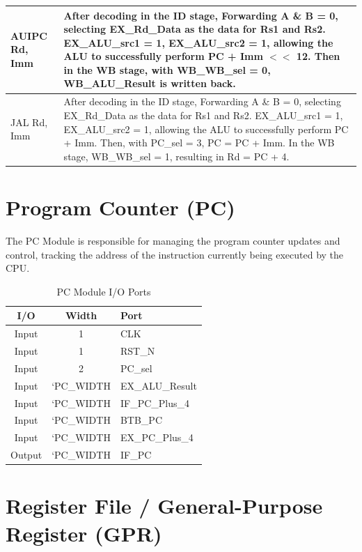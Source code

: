 \documentclass[12pt,a4paper]{report}
\begin{document}
\begin{longtable}{|l|p{12cm}|}
AUIPC Rd, Imm & After decoding in the ID stage, Forwarding A \& B = 0, selecting EX\_Rd\_Data as the data for Rs1 and Rs2. EX\_ALU\_src1 = 1, EX\_ALU\_src2 = 1, allowing the ALU to successfully perform PC + Imm $<<$ 12. Then in the WB stage, with WB\_WB\_sel = 0, WB\_ALU\_Result is written back. \\
\hline

JAL Rd, Imm & After decoding in the ID stage, Forwarding A \& B = 0, selecting EX\_Rd\_Data as the data for Rs1 and Rs2. EX\_ALU\_src1 = 1, EX\_ALU\_src2 = 1, allowing the ALU to successfully perform PC + Imm. Then, with PC\_sel = 3, PC = PC + Imm. In the WB stage, WB\_WB\_sel = 1, resulting in Rd = PC + 4. \\
\hline

\end{longtable}

\newpage

\section{Program Counter (PC)}

The PC Module is responsible for managing the program counter updates and control, tracking the address of the instruction currently being executed by the CPU.

\begin{table}[htbp]
\centering
\caption{PC Module I/O Ports}
\begin{tabular}{|c|c|l|}
\hline
\textbf{I/O} & \textbf{Width} & \textbf{Port} \\
\hline
Input & 1 & CLK \\
Input & 1 & RST\_N \\
Input & 2 & PC\_sel \\
Input & `PC\_WIDTH & EX\_ALU\_Result \\
Input & `PC\_WIDTH & IF\_PC\_Plus\_4 \\
Input & `PC\_WIDTH & BTB\_PC \\
Input & `PC\_WIDTH & EX\_PC\_Plus\_4 \\
Output & `PC\_WIDTH & IF\_PC \\
\hline
\end{tabular}
\end{table}

\section{Register File / General-Purpose Register (GPR)}
\end{document}
